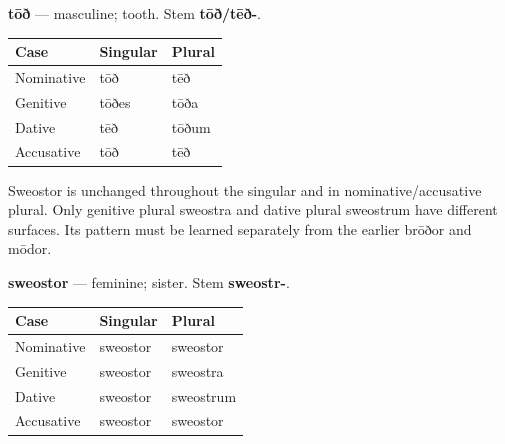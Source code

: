 \textbf{tōð} — masculine; tooth. Stem \textbf{tōð/\allowbreak{}tēð-}.

\par\begingroup
\fontsize{10.5}{13.2}\selectfont
\setlength{\LTleft}{0pt}\setlength{\LTright}{\fill}
\noindent
\begin{tabular}{@{}>{\raggedright\arraybackslash}p{39.46mm}>{\raggedright\arraybackslash}p{39.46mm}>{\raggedright\arraybackslash}p{39.46mm}@{}}
\toprule
\textbf{Case} & \textbf{Singular} & \textbf{Plural} \\
\midrule
Nominative & tōð & tēð \\
Genitive & tōðes & tōða \\
Dative & tēð & tōðum \\
Accusative & tōð & tēð \\
\bottomrule
\end{tabular}
\par\endgroup

Sweostor is unchanged throughout the singular and in nominative/\allowbreak{}accusative plural. Only genitive plural sweostra and dative plural sweostrum have different surfaces. Its pattern must be learned separately from the earlier brōðor and mōdor.

\textbf{sweostor} — feminine; sister. Stem \textbf{sweostr-}.

\par\begingroup
\fontsize{10.5}{13.2}\selectfont
\setlength{\LTleft}{0pt}\setlength{\LTright}{\fill}
\noindent
\begin{tabular}{@{}>{\raggedright\arraybackslash}p{39.46mm}>{\raggedright\arraybackslash}p{39.46mm}>{\raggedright\arraybackslash}p{39.46mm}@{}}
\toprule
\textbf{Case} & \textbf{Singular} & \textbf{Plural} \\
\midrule
Nominative & sweostor & sweostor \\
Genitive & sweostor & sweostra \\
Dative & sweostor & sweostrum \\
Accusative & sweostor & sweostor \\
\bottomrule
\end{tabular}
\par\endgroup

